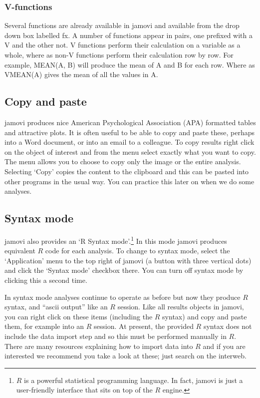 \documentclass[
  a4paper,
]{book}
\begin{document}
\hypertarget{v-functions}{%
\subsubsection{V-functions}\label{v-functions}}

Several functions are already available in jamovi and available from the
drop down box labelled fx. A number of functions appear in pairs, one
prefixed with a V and the other not. V functions perform their
calculation on a variable as a whole, where as non-V functions perform
their calculation row by row. For example, MEAN(A, B) will produce the
mean of A and B for each row. Where as VMEAN(A) gives the mean of all
the values in A.

\hypertarget{copy-and-paste}{%
\subsection{Copy and paste}\label{copy-and-paste}}

jamovi produces nice American Psychological Association (APA) formatted
tables and attractive plots. It is often useful to be able to copy and
paste these, perhaps into a Word document, or into an email to a
colleague. To copy results right click on the object of interest and
from the menu select exactly what you want to copy. The menu allows you
to choose to copy only the image or the entire analysis. Selecting
`Copy' copies the content to the clipboard and this can be pasted into
other programs in the usual way. You can practice this later on when we
do some analyses.

\hypertarget{syntax-mode}{%
\subsection{Syntax mode}\label{syntax-mode}}

jamovi also provides an `R Syntax mode'.\footnote{\(R\) is a powerful
  statistical programming language. In fact, jamovi is just a
  user-friendly interface that sits on top of the \(R\) engine.} In this
mode jamovi produces equivalent \(R\) code for each analysis. To change
to syntax mode, select the `Application' menu to the top right of jamovi
(a button with three vertical dots) and click the `Syntax mode' checkbox
there. You can turn off syntax mode by clicking this a second time.

In syntax mode analyses continue to operate as before but now they
produce \(R\) syntax, and ``ascii output'' like an \(R\) session. Like
all results objects in jamovi, you can right click on these items
(including the \(R\) syntax) and copy and paste them, for example into
an \(R\) session. At present, the provided \(R\) syntax does not include
the data import step and so this must be performed manually in \(R\).
There are many resources explaining how to import data into \(R\) and if
you are interested we recommend you take a look at these; just search on
the interweb.
\end{document}
